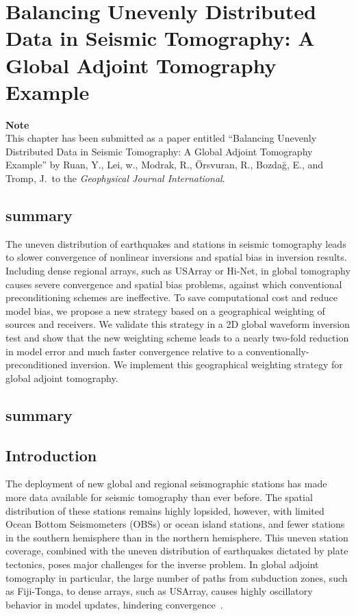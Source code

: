 \chapter{Balancing Unevenly Distributed Data in Seismic Tomography: {A} Global Adjoint Tomography Example\label{ch:weighting}}

\textbf{Note}\\
This chapter has been submitted as a paper entitled ``Balancing Unevenly Distributed Data in Seismic Tomography: {A} Global Adjoint Tomography Example'' by Ruan, Y., Lei, w., Modrak, R., \"{O}rsvuran, R., Bozda\u{g}, E., and Tromp, J.\ to the \textit{Geophysical Journal International}.


\section{summary}
The uneven distribution of earthquakes and stations in seismic tomography leads to slower convergence of nonlinear inversions and spatial bias in inversion results.
Including dense regional arrays, such as USArray or Hi-Net, in global tomography causes severe convergence and spatial bias problems, against which conventional preconditioning  schemes are ineffective.
To save computational cost and reduce model bias, we propose a new strategy based on a geographical weighting of sources and receivers.
We validate this strategy in
a 2D global waveform inversion test and show that the new weighting scheme leads to a nearly two-fold reduction in model error and much faster convergence relative to a conventionally-preconditioned inversion.
We implement this geographical weighting strategy for global adjoint tomography.
\section{summary}

%
%
\section{Introduction}

The deployment of new global and regional seismographic stations has made  more data available for seismic tomography than ever before.
The spatial distribution of these stations remains highly lopsided, however, with limited Ocean Bottom Seismometers (OBSs) or ocean island stations,
and fewer stations in the southern hemisphere than in the northern hemisphere. 
This uneven station coverage, combined with the uneven distribution of earthquakes dictated by plate tectonics, poses major challenges for the inverse problem.   In global adjoint tomography in particular, the large number of paths from subduction zones, such as Fiji-Tonga, to dense arrays,  such as USArray,  causes highly oscillatory behavior in model updates, hindering convergence~\cite{bozdaug2016global}. 

